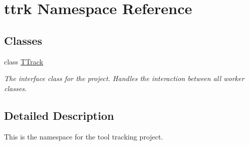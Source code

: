 \hypertarget{namespacettrk}{
\section{ttrk Namespace Reference}
\label{namespacettrk}
}
\subsection*{Classes}
\begin{DoxyCompactItemize}
\item 
class \hyperlink{classttrk_1_1TTrack}{TTrack}
\begin{DoxyCompactList}\small\item\em The interface class for the project. Handles the interaction between all worker classes. \item\end{DoxyCompactList}\end{DoxyCompactItemize}


\subsection{Detailed Description}
This is the namespace for the tool tracking project. 